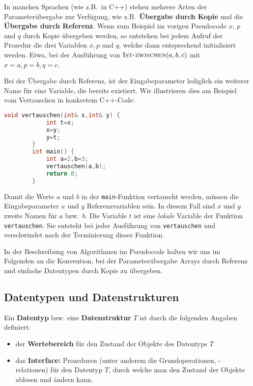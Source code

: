 \begin{bem} 
In manchen Sprachen (wie z.B.~in C++) stehen mehrere Arten der Parameterübergabe zur Verfügung, wie z.B.~\textbf{Übergabe durch Kopie} und die \textbf{Übergabe durch Referenz}. Wenn zum Beispiel im vorigen Pseudocode $x$, $p$ und $q$ durch Kopie übergeben werden, so entstehen bei jedem Aufruf der Prozedur die drei Variablen $x, p$ und $q$, welche dann entsprechend initialisiert werden. Etwa, bei der Ausführung von $\mathop{\text{\textsc{Ist-zwischen}}}(a,b,c)$ mit $x=a, p=b, q=c$. 
\end{bem} 

\begin{bsp} 
Bei der Übergabe durch Referenz, ist der Eingabeparameter lediglich ein weiterer Name für eine Variable, die bereits existiert. Wir illustrieren dies am Beispiel vom Vertauschen in konkretem C++-Code: 

\begin{center}
	\small 
	\begin{lstlisting}[language=C++]
		void vertauschen(int& x,int& y) {
			int t=x;
			x=y;
			y=t;
		}
		int main() {
			int a=2,b=3;
			vertauschen(a,b);
			return 0;
		}
	\end{lstlisting}
\end{center}

Damit die Werte $a$ und $b$ in der \texttt{main}-Funktion vertauscht werden, müssen die Eingabeparameter $x$ und $y$ Referenzvariablen sein. In diesem Fall sind $x$ und $y$ zweite Namen für $a$ bzw.~$b$. Die Variable $t$ ist eine \emph{lokale} Variable der Funktion \texttt{vertauschen}. Sie entsteht bei jeder Ausführung von \texttt{vertauschen} und verschwindet nach der Terminierung dieser Funktion. 
\end{bsp} 

\begin{bem}
	In der Beschreibung von Algorithmen im Pseudocode halten wir uns im Folgenden an die Konvention, bei der Parameterübergabe Arrays durch Referenz und einfache Datentypen durch Kopie zu übergeben.
\end{bem}


\subsection{Datentypen und Datenstrukturen}
\label{sect:datenstrukturen}

\begin{defn}
	Ein \textbf{Datentyp} bzw. eine \textbf{Datenstruktur} $T$ ist durch die folgenden Angaben definiert: 
	\begin{itemize} 
		\item[] der \textbf{Wertebereich} für den Zustand der Objekte des Datentyps $T$
		\item[] das \textbf{Interface:} Prozeduren (unter anderem die Grundoperationen, -relationen) für den Datentyp $T$, durch welche man den Zustand der Objekte ablesen und ändern kann. 
	\end{itemize}  
\end{defn} 

